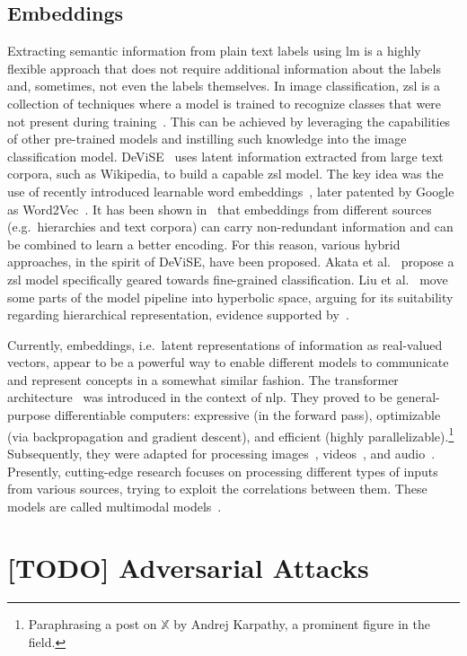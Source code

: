 \subsection{Embeddings}
\label{subsec:embeddings}

Extracting semantic information from plain text labels using \acrshort{lm} is a
highly flexible approach that does not require additional information about the
labels and, sometimes, not even the labels themselves. In image classification,
\acrfull{zsl} is a collection of techniques where a model is trained to
recognize classes that were not present during
training~\cite{AnIntroductionSoysal2020}. This can be achieved by leveraging
the capabilities of other pre-trained models and instilling such knowledge into
the image classification model. DeViSE~\cite{DeviseADeepFrome2013} uses latent
information extracted from large text corpora, such as Wikipedia, to build a
capable \acrshort{zsl} model. The key idea was the use of recently introduced
learnable word embeddings~\cite{EfficientEstimMikolo2013,
DistributedRepMikolo2013}, later patented by Google as
Word2Vec~\cite{ComputingNumerMikolo2013}. It has been shown
in~\cite{EvaluationOfOAkata2014, LabelEmbeddingAkata2015} that embeddings from
different sources (e.g.\ hierarchies and text corpora) can carry non-redundant
information and can be combined to learn a better encoding. For this reason,
various hybrid approaches, in the spirit of DeViSE, have been proposed. Akata
et al.~\cite{EvaluationOfOAkata2014} propose a \acrshort{zsl} model
specifically geared towards fine-grained classification. Liu et
al.~\cite{HyperbolicVisuLiuS2020} move some parts of the model pipeline into
hyperbolic space, arguing for its suitability regarding hierarchical
representation, evidence supported by~\cite{PoincareEmbeddNickel2017,
HyperbolicEntaGanea2018}.

Currently, embeddings, i.e.\ latent representations of information as
real-valued vectors, appear to be a powerful way to enable different models to
communicate and represent concepts in a somewhat similar fashion. The
transformer architecture~\cite{AttentionIsAlVaswan2017} was introduced in the
context of \acrfull{nlp}. They proved to be general-purpose differentiable
computers: expressive (in the forward pass), optimizable (via backpropagation
and gradient descent), and efficient (highly
parallelizable).\footnote{Paraphrasing a post on $\mathbb{X}$ by Andrej
Karpathy, a prominent figure in the field.} Subsequently, they were adapted for
processing images~\cite{ImageTransformParmar2018, EndToEndObjeCarion2020,
AnImageIsWorDosovi2020}, videos~\cite{VivitAVideoArnab2021,
TemporalContexShao2020}, and audio~\cite{NeuralSpeechSLiNa2018,
SpeechTransforDong2018, ConformerConvGulati2020}. Presently, cutting-edge
research focuses on processing different types of inputs from various sources,
trying to exploit the correlations between them. These models are called
multimodal models~\cite{ASurveyOnMulYinS2023}.

\section{[TODO] Adversarial Attacks}
\label{sec:adversarial-attacks-related-work}
